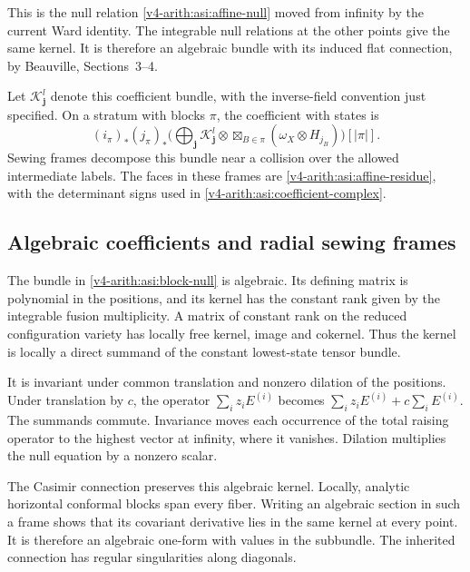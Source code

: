 This is the null relation \eqref{v4-arith:asi:affine-null} moved from infinity
by the current Ward identity. The integrable null relations at the
other points give the same kernel. It is therefore an algebraic bundle with its induced flat
connection, by Beauville, Sections~3--4.

Let $\mathcal K^l_{\mathbf j}$ denote this coefficient bundle, with the
inverse-field convention just specified. On a stratum with blocks
$\pi$, the coefficient with states is
\begin{equation}\label{v4-arith:asi:affine-cousin-term}
 (i_\pi)_*(j_\pi)_*\bigl(
 \bigoplus_{\mathbf j}\mathcal K^l_{\mathbf j}\otimes
       \boxtimes_{B\in\pi}(\omega_X\otimes H_{j_B})\bigr)[|\pi|].
\end{equation}
Sewing frames decompose this bundle near a collision over the allowed
intermediate labels. The faces in these frames are
\eqref{v4-arith:asi:affine-residue}, with the determinant signs used in
\eqref{v4-arith:asi:coefficient-complex}.

\subsection{Algebraic coefficients and radial sewing frames}
\label{v4-arith:asi:algebraic-cuts}

The bundle in \eqref{v4-arith:asi:block-null} is algebraic.
Its defining matrix is polynomial in the positions, and its kernel
has the constant rank given by the integrable fusion multiplicity.
A matrix of constant rank on the reduced configuration variety has
locally free kernel, image and cokernel. Thus the kernel is locally
a direct summand of the constant lowest-state tensor bundle.

It is invariant under common translation and nonzero dilation of
the positions. Under translation by \(c\), the operator
\(\sum_i z_iE^{(i)}\) becomes
\(\sum_i z_iE^{(i)}+c\sum_iE^{(i)}\).
The summands commute. Invariance moves each occurrence of the total
raising operator to the highest vector at infinity, where it
vanishes. Dilation multiplies the null equation by a nonzero scalar.

The Casimir connection preserves this algebraic kernel.
Locally, analytic horizontal conformal blocks span every fiber.
Writing an algebraic section in such a frame shows that its
covariant derivative lies in the same kernel at every point.
It is therefore an algebraic one-form with values in the subbundle.
The inherited connection has regular singularities along diagonals.

